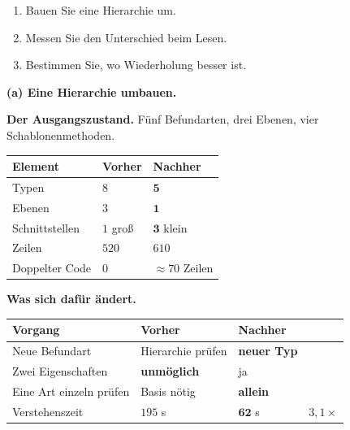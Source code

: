 \begin{aufgabe}
\begin{enumerate}[label=(\alph*)]
\item Bauen Sie eine Hierarchie um.
\item Messen Sie den Unterschied beim Lesen.
\item Bestimmen Sie, wo Wiederholung besser ist.
\end{enumerate}

\loesung
\textbf{(a) Eine Hierarchie umbauen.}

\textbf{Der Ausgangszustand.} Fünf Befundarten, drei Ebenen, vier Schablonenmethoden.

\begin{center}
{\small
\renewcommand{\arraystretch}{1.45}
\begin{tabular}{@{}P{2.8cm}P{2.4cm}P{2.8cm}@{}}
\toprule
\textbf{Element} & \textbf{Vorher} & \textbf{Nachher}\\
\midrule
Typen & $8$ & $\mathbf{5}$\\
Ebenen & $3$ & $\mathbf{1}$\\
Schnittstellen & $1$ groß & $\mathbf{3}$ klein\\
Zeilen & $520$ & $610$\\
Doppelter Code & $0$ & \textcolor{akzent}{$\approx70$ Zeilen}\\
\bottomrule
\end{tabular}}
\end{center}

\begin{center}
\begin{minipage}{0.88\textwidth}
\end{minipage}
\end{center}

\textbf{Was sich dafür ändert.}

\begin{center}
\renewcommand{\arraystretch}{1.45}
\begin{tabular}{@{}P{3.0cm}P{2.2cm}P{2.4cm}P{1.6cm}@{}}
\toprule
\textbf{Vorgang} & \textbf{Vorher} & \textbf{Nachher} & \\
\midrule
Neue Befundart & \textcolor{akzent}{Hierarchie prüfen} & \textcolor{gruen}{\textbf{neuer Typ}} & \\
Zwei Eigenschaften & \textcolor{akzent}{\textbf{unmöglich}} & \textcolor{gruen}{ja} & \\
Eine Art einzeln prüfen & \textcolor{akzent}{Basis nötig} & \textcolor{gruen}{\textbf{allein}} & \\
Verstehenszeit & $195$ s & $\mathbf{62}$ s & $3{,}1\times$\\
\bottomrule
\end{tabular}
\end{center}


\end{aufgabe}
